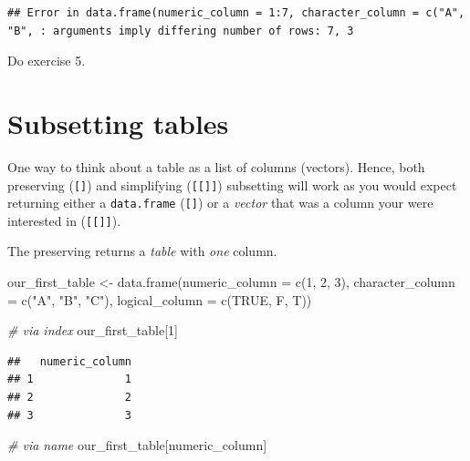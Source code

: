 \documentclass[
]{book}
\newenvironment{Shaded}{\begin{snugshade}}{\end{snugshade}}
\newcommand{\AttributeTok}[1]{\textcolor[rgb]{0.77,0.63,0.00}{#1}}
\newcommand{\CommentTok}[1]{\textcolor[rgb]{0.56,0.35,0.01}{\textit{#1}}}
\newcommand{\ConstantTok}[1]{\textcolor[rgb]{0.00,0.00,0.00}{#1}}
\newcommand{\DecValTok}[1]{\textcolor[rgb]{0.00,0.00,0.81}{#1}}
\newcommand{\FunctionTok}[1]{\textcolor[rgb]{0.00,0.00,0.00}{#1}}
\newcommand{\NormalTok}[1]{#1}
\newcommand{\OtherTok}[1]{\textcolor[rgb]{0.56,0.35,0.01}{#1}}
\newcommand{\StringTok}[1]{\textcolor[rgb]{0.31,0.60,0.02}{#1}}
\begin{document}
\begin{verbatim}
## Error in data.frame(numeric_column = 1:7, character_column = c("A", "B", : arguments imply differing number of rows: 7, 3
\end{verbatim}

Do exercise 5.

\hypertarget{table-subsetting}{%
\section{Subsetting tables}\label{table-subsetting}}

One way to think about a table as a list of columns (vectors). Hence, both preserving (\texttt{{[}{]}}) and simplifying (\texttt{{[}{[}{]}{]}}) subsetting will work as you would expect returning either a \texttt{data.frame} (\texttt{{[}{]}}) or a \emph{vector} that was a column your were interested in (\texttt{{[}{[}{]}{]}}).

The preserving returns a \emph{table} with \emph{one} column.

\begin{Shaded}
\begin{Highlighting}[]
\NormalTok{our\_first\_table }\OtherTok{\textless{}{-}} \FunctionTok{data.frame}\NormalTok{(}\AttributeTok{numeric\_column =} \FunctionTok{c}\NormalTok{(}\DecValTok{1}\NormalTok{, }\DecValTok{2}\NormalTok{, }\DecValTok{3}\NormalTok{), }
                              \AttributeTok{character\_column =} \FunctionTok{c}\NormalTok{(}\StringTok{"A"}\NormalTok{, }\StringTok{"B"}\NormalTok{, }\StringTok{"C"}\NormalTok{),}
                              \AttributeTok{logical\_column =} \FunctionTok{c}\NormalTok{(}\ConstantTok{TRUE}\NormalTok{, F, T))}

\CommentTok{\# via index}
\NormalTok{our\_first\_table[}\DecValTok{1}\NormalTok{]}
\end{Highlighting}
\end{Shaded}

\begin{verbatim}
##   numeric_column
## 1              1
## 2              2
## 3              3
\end{verbatim}

\begin{Shaded}
\begin{Highlighting}[]
\CommentTok{\# via name }
\NormalTok{our\_first\_table[}\StringTok{\textquotesingle{}numeric\_column\textquotesingle{}}\NormalTok{]}
\end{Highlighting}
\end{Shaded}
\end{document}
